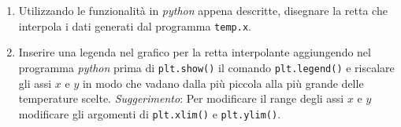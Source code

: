 \documentclass[11pt]{article}
\begin{document}
\begin{enumerate}
  \item Utilizzando le funzionalit\`a in {\it python\/} appena descritte, disegnare la retta che interpola i dati generati dal programma \texttt{temp.x}.
\item 
Inserire una legenda nel grafico per la retta interpolante aggiungendo nel programma \textit{python} prima di 
\lstinline[language=python]!plt.show()! 
il comando \lstinline[language=python]!plt.legend()! e riscalare gli assi $x$ e $y$ in modo che vadano dalla pi\`u piccola alla pi\`u grande delle temperature scelte. {\em Suggerimento}: Per modificare il range degli assi $x$ e $y$ modificare gli argomenti di \texttt{plt.xlim()} e \texttt{plt.ylim()}.
\end{enumerate}  
\end{document}

